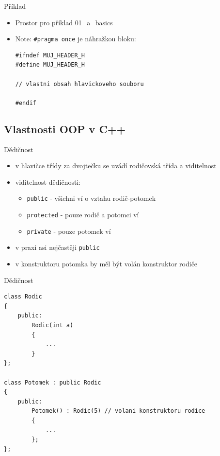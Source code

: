 \documentclass{beamer}
\begin{document}
\begin{xframe}{Příklad}
	\begin{itemize}
		\item Prostor pro příklad 01\_a\_basics
		
		\item Note: \texttt{\#pragma once} je náhražkou bloku:
		
\begin{lstlisting}[basicstyle=\fontsize{9}{10}\selectfont\ttfamily]
#ifndef MUJ_HEADER_H
#define MUJ_HEADER_H

// vlastni obsah hlavickoveho souboru

#endif
\end{lstlisting}
		
	\end{itemize}
\end{xframe}

\subsection{Vlastnosti OOP v C++}


\begin{xframe}{Dědičnost}
	\begin{itemize}
		\item v hlavičce třídy za dvojtečku se uvádí rodičovská třída a viditelnost
		\item viditelnost dědičnosti:
			\begin{itemize}
				\item \texttt{public} - všichni ví o vztahu rodič-potomek
				\item \texttt{protected} - pouze rodič a potomci ví
				\item \texttt{private} - pouze potomek ví
			\end{itemize}
		\item v praxi asi nejčastěji \texttt{public}
		\item v konstruktoru potomka by měl být volán konstruktor rodiče
	\end{itemize}
\end{xframe}

\begin{xframe}{Dědičnost}
\begin{lstlisting}[basicstyle=\fontsize{9}{10}\selectfont\ttfamily]
class Rodic
{
    public:
        Rodic(int a)
        {
            ...
        }
};

class Potomek : public Rodic
{
    public:
        Potomek() : Rodic(5) // volani konstruktoru rodice
        {
            ...
        };
};
\end{lstlisting}
\end{xframe}
\end{document}
